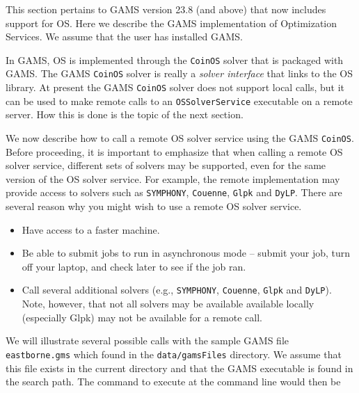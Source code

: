 


\label{section:gamslinks}


This section pertains to GAMS version 23.8 (and above) that now includes support for OS.  
Here we describe the GAMS  implementation of Optimization Services.  We assume that the user has installed GAMS.

In GAMS, OS is implemented through the {\tt CoinOS} solver that is packaged with GAMS.      
The GAMS {\tt CoinOS} solver is really a {\it solver interface} that links to the OS library.
At present the GAMS  {\tt CoinOS} solver does not support local calls, but it can be used to make
remote calls to an {\tt OSSolverService} executable on a remote server. How this is done is the topic of the next section.



\label{section:gamsremote}

We now describe how to call  a remote OS   solver service using the GAMS {\tt CoinOS}.  Before proceeding, 
it is important to emphasize that when calling a remote OS solver service, different sets of solvers may be supported, even for the same version of the OS solver service. 
For example, the remote 
implementation may provide access to solvers such as {\tt SYMPHONY}, {\tt Couenne}, {\tt Glpk} and {\tt DyLP}.  
There are several reason why you might wish to use a remote OS solver service. 

\begin{itemize}
\item Have access to a faster machine.

\item  Be able to  submit jobs to run in asynchronous mode -- submit your job,  turn off your laptop,  
and check later to see if the job ran.

\item Call several additional solvers (e.g., {\tt SYMPHONY}, {\tt Couenne}, {\tt Glpk} and {\tt DyLP}).
Note, however, that not all solvers may be available available locally (especially Glpk) may not be available for a remote call.

\end{itemize}

We will illustrate several possible calls with the sample GAMS file {\tt eastborne.gms} which found in the
{\tt  data/gamsFiles} directory. We assume that this file exists in the current directory and that the GAMS executable is found in the search path. The command to execute at the command line would then be

